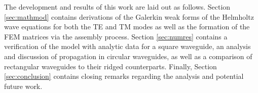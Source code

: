 The development and results of this work are laid out as follows. Section \ref{sec:mathmod} contains derivations of the Galerkin weak forms of the Helmholtz wave equations for both the TE and TM modes as well as the formation of the FEM matrices via the assembly process. Section \ref{sec:numres} contains a verification of the model with analytic data for a square waveguide, an analysis and discussion of propagation in circular waveguides, as well as a comparison of rectangular waveguides to their ridged counterparts. Finally, Section \ref{sec:conclusion} contains closing remarks regarding the analysis and potential future work.